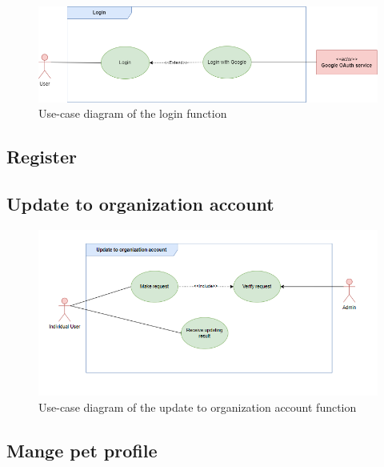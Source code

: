 \begin{figure}[H]
  \centering
  \includegraphics[width=1\textwidth]{Figures/login_ucd.png}
  \caption{Use-case diagram of the login function}
  \label{fig:login_activity_diagram}
\end{figure}



\subsection{Register}



\subsection{Update to organization account}

\begin{figure}[H]
  \centering
  \includegraphics[width=1\textwidth]{Figures/update_org_ucd.png}
  \caption{Use-case diagram of the update to organization account function}
  \label{fig:update-org_activity_diagram}
\end{figure}



\subsection{Mange pet profile}

